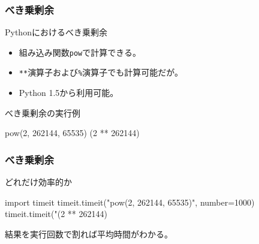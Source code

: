 \documentclass[aspectratio=169,dvipdfmx,14pt,notheorems]{beamer}
\theoremstyle{definition}
\begin{document}
\begin{frame}[fragile]\frametitle{べき乗剰余}

\begin{block}{Pythonにおけるべき乗剰余}
\begin{itemize}
\item 組み込み関数\texttt{pow}で計算できる。
\item \texttt{**}演算子および\texttt{\%}演算子でも計算可能だが。
\item Python 1.5から利用可能。
\end{itemize}
\end{block}

\begin{exampleblock}{べき乗剰余の実行例}

\begin{pyconsole}
pow(2, 262144, 65535)
(2 ** 262144) %
\end{pyconsole}



\end{exampleblock}

\end{frame}

\begin{frame}[fragile]\frametitle{べき乗剰余}

\begin{exampleblock}{どれだけ効率的か}

\begin{pyconsole}
import timeit
timeit.timeit("pow(2, 262144, 65535)", number=1000)
timeit.timeit("(2 ** 262144) %
\end{pyconsole}

\end{exampleblock}
結果を実行回数で割れば平均時間がわかる。

\end{frame}
\end{document}
